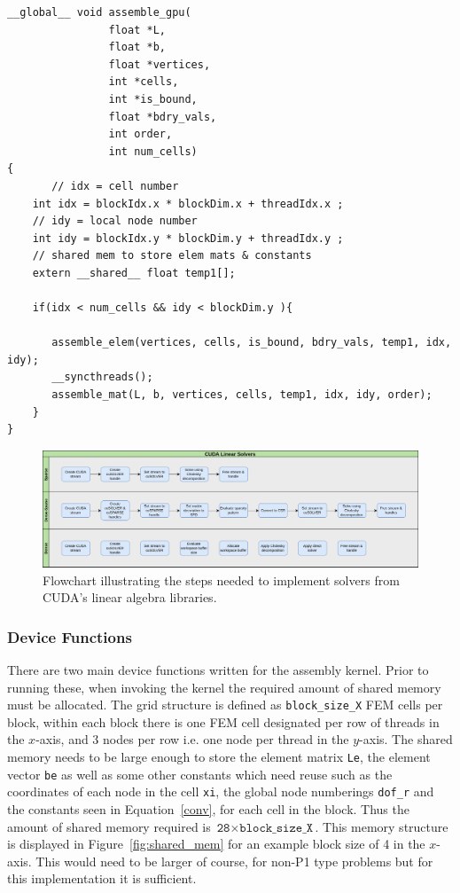 \begin{lstlisting}[style=cppStyle,caption={Main kernel in general FEM approach to generate element matrices and assemble global linear system.},label={lst:fem_main}]
__global__ void assemble_gpu(
                float *L, 
                float *b, 
                float *vertices, 
                int *cells, 
                int *is_bound, 
                float *bdry_vals, 
                int order,
                int num_cells)
{
	   // idx = cell number
    int idx = blockIdx.x * blockDim.x + threadIdx.x ;
    // idy = local node number
    int idy = blockIdx.y * blockDim.y + threadIdx.y ;
    // shared mem to store elem mats & constants
    extern __shared__ float temp1[];

    if(idx < num_cells && idy < blockDim.y ){

       assemble_elem(vertices, cells, is_bound, bdry_vals, temp1, idx, idy);
       __syncthreads();
       assemble_mat(L, b, vertices, cells, temp1, idx, idy, order);
    }
}
\end{lstlisting}
\begin{figure}
	\centering
	\includegraphics[width=0.9\linewidth]{Figures/cuda_solvers}
	\caption{Flowchart illustrating the steps needed to implement solvers from CUDA's linear algebra libraries.}
	\label{fig:cusolvers}
\end{figure}

\subsubsection{Device Functions}

There are two main device functions written for the assembly kernel. Prior to running these, when invoking the kernel the required amount of shared memory must be allocated. The grid structure is defined as \texttt{block\_size\_X} FEM cells per block, within each block there is one FEM cell designated per row of threads in the $x$-axis, and 3 nodes per row i.e. one node per thread in the $y$-axis. The shared memory needs to be large enough to store the element matrix \texttt{Le}, the element vector \texttt{be} as well as some other constants which need reuse such as the coordinates of each node in the cell \texttt{xi}, the global node numberings \texttt{dof\_r} and the constants seen in Equation~\eqref{conv}, for each cell in the block. Thus the amount of shared memory required is $\texttt{28}\times\texttt{block\_size\_X}$. This memory structure is displayed in Figure~\ref{fig:shared_mem} for an example block size of 4 in the $x$-axis. This would need to be larger of course, for non-P1 type problems but for this implementation it is sufficient.

